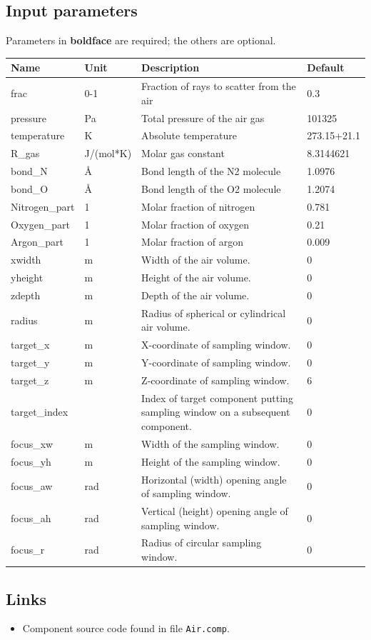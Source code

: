 \subsection*{Input parameters}
Parameters in \textbf{boldface} are required; the others are optional.

\begin{longtable}{p{}p{}p{}p{}}
\toprule
\textbf{Name} & \textbf{Unit} & \textbf{Description} & \textbf{Default} \\
\midrule
\endhead
frac & 0-1 & Fraction of rays to scatter from the air & 0.3 \\
pressure & Pa & Total pressure of the air gas & 101325 \\
temperature & K & Absolute temperature & 273.15+21.1 \\
R\_gas & J/(mol*K) & Molar gas constant & 8.3144621 \\
bond\_N & \AA{} & Bond length of the N2 molecule & 1.0976 \\
bond\_O & \AA{} & Bond length of the O2 molecule & 1.2074 \\
Nitrogen\_part & 1 & Molar fraction of nitrogen & 0.781 \\
Oxygen\_part & 1 & Molar fraction of oxygen & 0.21 \\
Argon\_part & 1 & Molar fraction of argon & 0.009 \\
xwidth & m & Width of the air volume. & 0 \\
yheight & m & Height of the air volume. & 0 \\
zdepth & m & Depth of the air volume. & 0 \\
radius & m & Radius of spherical or cylindrical air volume. & 0 \\
target\_x & m & X-coordinate of sampling window. & 0 \\
target\_y & m & Y-coordinate of sampling window. & 0 \\
target\_z & m & Z-coordinate of sampling window. & 6 \\
target\_index &   & Index of target component putting sampling window on a subsequent component. & 0 \\
focus\_xw & m & Width of the sampling window. & 0 \\
focus\_yh & m & Height of the sampling window. & 0 \\
focus\_aw & rad & Horizontal (width) opening angle of sampling window. & 0 \\
focus\_ah & rad & Vertical (height) opening angle of sampling window. & 0 \\
focus\_r & rad & Radius of circular sampling window. & 0 \\
\bottomrule
\end{longtable}

\subsection*{Links}
\begin{itemize}
  \item Component source code found in file \texttt{Air.comp}.
\end{itemize}
